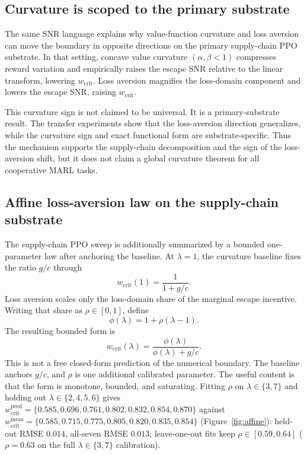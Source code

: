 \documentclass[letterpaper]{article} %
\theoremstyle{plain}
\newcommand{\wcrit}{w_{\mathrm{crit}}}
\begin{document}
\subsection{Curvature is scoped to the primary substrate}
The same SNR language explains why value-function curvature and loss aversion can move the boundary
in opposite directions on the primary supply-chain PPO substrate. In that setting, concave value
curvature $(\alpha,\beta<1)$ compresses reward variation and empirically raises the escape SNR
relative to the linear transform, lowering $\wcrit$. Loss aversion magnifies the loss-domain
component and lowers the escape SNR, raising $\wcrit$.

This curvature sign is not claimed to be universal. It is a primary-substrate result. The transfer
experiments show that the loss-aversion direction generalizes, while the curvature sign and exact
functional form are substrate-specific. Thus the mechanism supports the supply-chain decomposition
and the sign of the loss-aversion shift, but it does not claim a global curvature theorem for all
cooperative MARL tasks.

\subsection{Affine loss-aversion law on the supply-chain substrate}
The supply-chain PPO sweep is additionally summarized by a bounded one-parameter law after anchoring
the baseline. At $\lambda=1$, the curvature baseline fixes the ratio $g/c$ through
\begin{equation}
 \wcrit(1)=\frac{1}{1+g/c}.
\end{equation}
Loss aversion scales only the loss-domain share of the marginal escape incentive. Writing that
share as $\rho\in[0,1]$, define
\begin{equation}
 \phi(\lambda)=1+\rho(\lambda-1).
\end{equation}
The resulting bounded form is
\begin{equation}
 \wcrit(\lambda)=\frac{\phi(\lambda)}{\phi(\lambda)+g/c}.
 \label{eq:wcrit_lambda}
\end{equation}
This is not a free closed-form prediction of the numerical boundary. The baseline anchors $g/c$,
and $\rho$ is one additional calibrated parameter. The useful content is that the form is monotone,
bounded, and saturating. Fitting $\rho$ on $\lambda\in\{3,7\}$ and holding out $\lambda\in\{2,4,5,6\}$
gives $\wcrit^{\mathrm{pred}}=\{0.585,0.696,0.761,0.802,0.832,0.854,0.870\}$ against
$\wcrit^{\mathrm{meas}}=\{0.585,0.715,0.775,0.805,0.820,0.835,0.854\}$ (Figure~\ref{fig:affine}):
held-out RMSE $0.014$, all-seven RMSE $0.013$; leave-one-out fits keep $\rho\in[0.59,0.64]$
($\rho=0.63$ on the full $\lambda\in\{3,7\}$ calibration).
\end{document}
